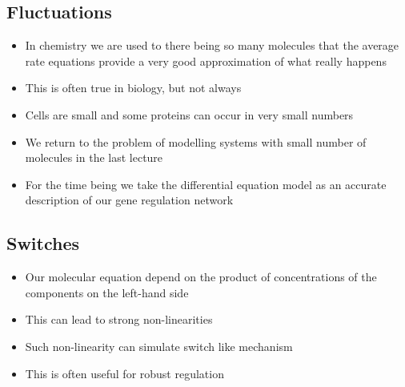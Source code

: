 
\begin{slide}
\section{Fluctuations}

\begin{PauseHighLight}
  \begin{itemize}
  \item In chemistry we are used to there being so many molecules that
    the average rate equations provide a very good approximation of what
    really happens\pause
  \item This is often true in biology, but not always\pause
  \item Cells are small and some proteins can occur in very small
    numbers\pause
  \item We return to the problem of modelling systems with small number
    of molecules in the last lecture\pause
  \item For the time being we take the differential equation model as
    an accurate description of our gene regulation network\pause
  \end{itemize}
\end{PauseHighLight}

\end{slide}


\begin{slide}
\section{Switches}

\begin{PauseHighLight}
  \begin{itemize}
  \item Our molecular equation depend on the product of concentrations
    of the components on the left-hand side\pause
  \item This can lead to strong non-linearities\pause
  \item Such non-linearity can simulate switch like mechanism\pause
  \item This is often useful for robust regulation\pause
  \end{itemize}
\end{PauseHighLight}

\end{slide}


